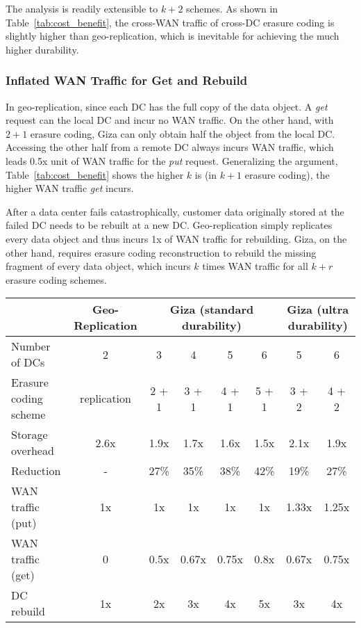 The analysis is readily extensible to $k+2$ schemes. As shown in Table~\ref{tab:cost_benefit}, the cross-WAN traffic of cross-DC erasure coding is slightly higher than geo-replication, which is inevitable for achieving the much higher durability.

\subsubsection{Inflated WAN Traffic for Get and Rebuild}

In geo-replication, since each DC has the full copy of the data object. A {\em get} request can the local DC and incur no WAN traffic. On the other hand, with $2+1$ erasure coding, Giza can only obtain half the object from the local DC. Accessing the other half from a remote DC always incurs WAN traffic, which leads 0.5x unit of WAN traffic for the {\em put} request. Generalizing the argument, Table~\ref{tab:cost_benefit} shows the higher $k$ is (in $k+1$ erasure coding), the higher WAN traffic {\em get} incurs.

After a data center fails catastrophically, customer data originally stored at the failed DC needs to be rebuilt at a new DC. Geo-replication simply replicates every data object and thus incurs 1x of WAN traffic for rebuilding. Giza, on the other hand, requires erasure coding reconstruction to rebuild the missing fragment of every data object, which incurs $k$ times WAN traffic for all $k+r$ erasure coding schemes.

\begin{table*}[thp]
\centering
\begin{tabular}{|l||c||c|c|c|c||c|c|}
\hline
				& Geo-Replication    	& \multicolumn{4}{c||}{Giza (standard durability)}		& \multicolumn{2}{c|}{Giza (ultra durability)}
\\ \hline \hline
Number of DCs 				& 2										& 3 & 4 & 5 & 6									& 5 & 6
\\ \hline
Erasure coding scheme & replication					& 2 + 1 & 3 + 1 & 4 + 1 & 5 + 1	& 3 + 2 & 4 + 2
\\ \hline \hline
Storage overhead			& 2.6x								& 1.9x & 1.7x & 1.6x & 1.5x			& 2.1x & 1.9x
\\ \hline
Reduction							& -										& 27\% & 35\% & 38\% & 42\%			& 19\% & 27\%
\\ \hline \hline
WAN traffic (put)			& 1x									& 1x & 1x & 1x & 1x 						& 1.33x & 1.25x
\\ \hline
WAN traffic (get)			& 0										& 0.5x & 0.67x & 0.75x & 0.8x		& 0.67x & 0.75x
\\ \hline
DC rebuild 						& 1x									& 2x & 3x & 4x & 5x 						& 3x & 4x
\\ \hline \hline
\end{tabular}
\caption{Trade-off of storage, bandwidth and durability.}
\label{tab:cost_benefit}
\end{table*}

